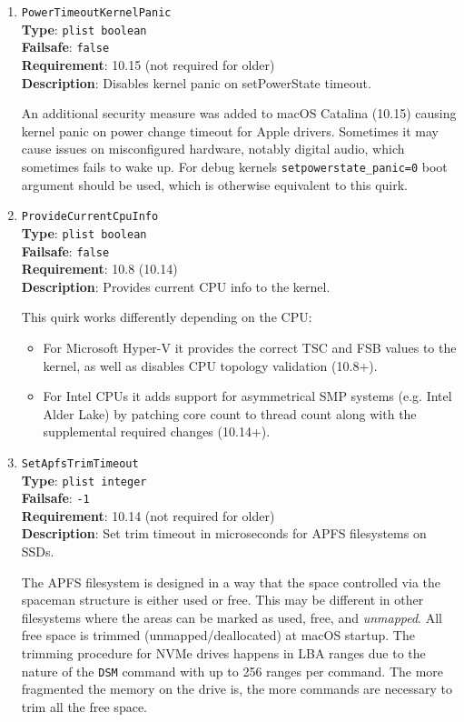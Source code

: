 \documentclass[]{article}
\providecommand{\tightlist}{%
  \setlength{\itemsep}{0pt}\setlength{\parskip}{0pt}}
\begin{document}
\begin{enumerate}
\item
  \texttt{PowerTimeoutKernelPanic}\\
  \textbf{Type}: \texttt{plist\ boolean}\\
  \textbf{Failsafe}: \texttt{false}\\
  \textbf{Requirement}: 10.15 (not required for older)\\
  \textbf{Description}: Disables kernel panic on setPowerState timeout.

  An additional security measure was added to macOS Catalina (10.15) causing
  kernel panic on power change timeout for Apple drivers. Sometimes it may cause
  issues on misconfigured hardware, notably digital audio, which sometimes fails
  to wake up. For debug kernels \texttt{setpowerstate\_panic=0} boot argument
  should be used, which is otherwise equivalent to this quirk.

\item
  \texttt{ProvideCurrentCpuInfo}\\
  \textbf{Type}: \texttt{plist\ boolean}\\
  \textbf{Failsafe}: \texttt{false}\\
  \textbf{Requirement}: 10.8 (10.14)\\
  \textbf{Description}: Provides current CPU info to the kernel.

  This quirk works differently depending on the CPU:

  \begin{itemize}
  \tightlist
  \item For Microsoft Hyper-V it provides the correct TSC and FSB values
    to the kernel, as well as disables CPU topology validation (10.8+).
  \item For Intel CPUs it adds support for asymmetrical SMP systems
    (e.g. Intel Alder Lake) by patching core count to thread count along
    with the supplemental required changes (10.14+).
  \end{itemize}

\item
  \texttt{SetApfsTrimTimeout}\\
  \textbf{Type}: \texttt{plist\ integer}\\
  \textbf{Failsafe}: \texttt{-1}\\
  \textbf{Requirement}: 10.14 (not required for older)\\
  \textbf{Description}: Set trim timeout in microseconds for APFS filesystems on SSDs.

  The APFS filesystem is designed in a way that the space controlled via
  the spaceman structure is either used or free. This may be different in
  other filesystems where the areas can be marked as used, free, and
  \emph{unmapped}. All free space is trimmed (unmapped/deallocated)
  at macOS startup. The trimming procedure for NVMe drives happens
  in LBA ranges due to the nature of the \texttt{DSM} command with
  up to 256 ranges per command. The more fragmented the memory
  on the drive is, the more commands are necessary to trim
  all the free space.


\end{enumerate}
\end{document}
